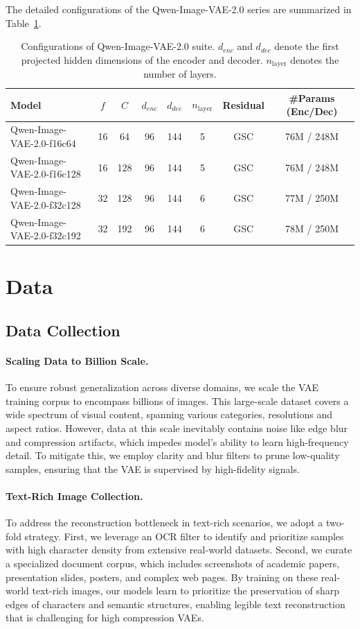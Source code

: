 \documentclass{llmxive}
\begin{document}
The detailed configurations of the Qwen-Image-VAE-2.0 series are summarized in Table~\ref{tab:vae_configs}.

\begin{table}[htbp]
\centering
\begin{tabular}{lccccccc}
\toprule
\textbf{Model} & $f$ & $C$ & $d_{enc}$ & $d_{dec}$ & $n_{\text{layer}}$ & \textbf{Residual} & \textbf{\#Params (Enc/Dec)} \\ \midrule
Qwen-Image-VAE-2.0-f16c64  & 16 & 64  & 96 & 144 & 5 & GSC & 76M / 248M \\
Qwen-Image-VAE-2.0-f16c128  & 16 & 128  & 96 & 144 & 5 & GSC & 76M / 248M \\
Qwen-Image-VAE-2.0-f32c128 & 32 & 128 & 96 & 144 & 6 & GSC & 77M / 250M \\
Qwen-Image-VAE-2.0-f32c192 & 32 & 192 & 96 & 144 & 6 & GSC & 78M / 250M \\ \bottomrule
\end{tabular}
\caption{Configurations of Qwen-Image-VAE-2.0 suite. $d_{enc}$ and $d_{dec}$ denote the first projected hidden dimensions of the encoder and decoder. $n_{\text{layer}}$ denotes the number of layers.}
\label{tab:vae_configs}
\end{table}


\section{Data}
\subsection{Data Collection}
\paragraph{Scaling Data to Billion Scale.} To ensure robust generalization across diverse domains, we scale the VAE training corpus to encompass billions of images. This large-scale dataset covers a wide spectrum of visual content, spanning various categories, resolutions and aspect ratios. However, data at this scale inevitably contains noise like edge blur and compression artifacts, which impedes model's ability to learn high-frequency detail. To mitigate this, we employ clarity and blur filters to prune low-quality samples, ensuring that the VAE is supervised by high-fidelity signals.

\paragraph{Text-Rich Image Collection.} To address the reconstruction bottleneck in text-rich scenarios, we adopt a two-fold strategy. First, we leverage an OCR filter to identify and prioritize samples with high character density from extensive real-world datasets. Second, we curate a specialized document corpus, which includes screenshots of academic papers, presentation slides, posters, and complex web pages. By training on these real-world text-rich images, our models learn to prioritize the preservation of sharp edges of characters and semantic structures, enabling legible text reconstruction that is challenging for high compression VAEs.
\end{document}
